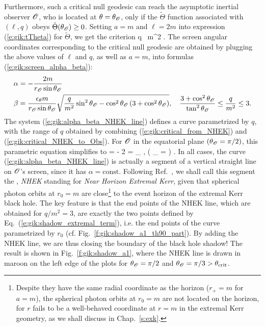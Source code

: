 Furthermore, such a critical null geodesic can reach the asymptotic inertial
observer $\mathscr{O}$, who is located at $\theta = \theta_{\mathscr{O}}$, only if the
$\tilde{\Theta}$ function associated with $(\ell,q)$ obeys $\tilde{\Theta}(\theta_{\mathscr{O}}) \geq 0$.
Setting $a=m$ and $\ell=2m$ into expression (\ref{e:gik:tTheta}) for $\tilde{\Theta}$,
we get the criterion
\be \label{e:gik:critical_NHEK_to_Obs}
    q \geq {} \, m^2 .
\ee
The screen angular coordinates corresponding to the critical null geodesic
are obtained by plugging the
above values of $\ell$ and $q$, as well as $a=m$, into formulas (\ref{e:gik:screen_alpha_beta}):
\begin{subequations}
\label{e:gik:alpha_beta_NHEK_line}
\begin{align}
& \alpha = - \frac{2 m}{r_{\mathscr{O}}\sin\theta_{\mathscr{O}}}  \\
&  \beta = \frac{\epsilon_\theta m}{r_{\mathscr{O}}\sin\theta_{\mathscr{O}}} \sqrt{ \frac{q}{m^2}\sin^2\theta_{\mathscr{O}}
 - \cos^2\theta_{\mathscr{O}} \left( 3 + \cos^2\theta_{\mathscr{O}} \right)  },
 \quad \frac{3 + \cos^2\theta_{\mathscr{O}}}{\tan^2\theta_{\mathscr{O}}}  \leq \frac{q}{m^2} \leq 3 .
\end{align}
\end{subequations}
The system (\ref{e:gik:alpha_beta_NHEK_line}) defines a curve parametrized by $q$,
with the range of $q$ obtained by combining (\ref{e:gik:critical_from_NHEK}) and (\ref{e:gik:critical_NHEK_to_Obs}).
For $\mathscr{O}$ in the equatorial plane $(\theta_{\mathscr{O}} = \pi/2)$, this parametric equation
simplifies to
\be
    \alpha = - 2 
    \qand
    \beta = \eps_\th {} ,
     \leq {}   \qquad\left( \th_{\Obs} =  \right) .
\ee
In all cases, the curve (\ref{e:gik:alpha_beta_NHEK_line})
is actually a segment of a vertical straight line on $\mathscr{O}$'s screen, since it
has $\alpha=\mathrm{const}$. Following Ref.~\cite{GrallLS18},
we shall call this segment the , \emph{NHEK} standing
for \emph{Near Horizon Extremal Kerr}, given that spherical photon orbits
at $r_0=m$ are close\footnote{Despite they have the same radial coordinate as the horizon ($r_+=m$ for $a=m$),
the spherical photon orbits at $r_0=m$ are not located
on the horizon, for $r$ fails to be a well-behaved coordinate at $r=m$ in
the extremal Kerr geometry, as we shall discuss in Chap.~\ref{s:exk}.}
to the event horizon of the extremal Kerr black hole.
The key feature is that the end points
of the NHEK line, which are obtained for $q/m^2 = 3$,
are exactly the two points defined by Eq.~(\ref{e:gik:shadow_extremal_term}),
i.e. the end points of the curve parametrized by $r_0$ (cf. Fig.~\ref{f:gik:shadow_a1_th90_part}).
By adding the NHEK line, we are thus
closing the boundary of the black hole shadow! The result is shown in Fig.~\ref{f:gik:shadow_a1},
where the NHEK line is drawn in maroon on the left edge of the plots
for $\theta_{\mathscr{O}} = \pi/2$ and $\theta_{\mathscr{O}} = \pi/3 > \theta_{\rm crit}$.

